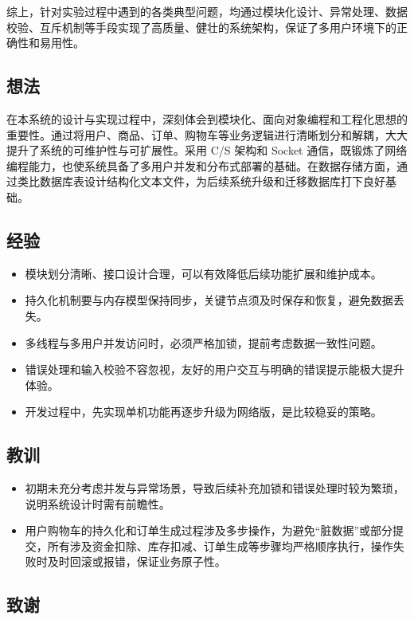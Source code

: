 \documentclass[11pt]{article}
\begin{document}
综上，针对实验过程中遇到的各类典型问题，均通过模块化设计、异常处理、数据校验、互斥机制等手段实现了高质量、健壮的系统架构，保证了多用户环境下的正确性和易用性。

\subsection{想法}

在本系统的设计与实现过程中，深刻体会到模块化、面向对象编程和工程化思想的重要性。通过将用户、商品、订单、购物车等业务逻辑进行清晰划分和解耦，大大提升了系统的可维护性与可扩展性。采用 C/S 架构和 Socket 通信，既锻炼了网络编程能力，也使系统具备了多用户并发和分布式部署的基础。在数据存储方面，通过类比数据库表设计结构化文本文件，为后续系统升级和迁移数据库打下良好基础。

\subsection{经验}

\begin{itemize}
    \item 模块划分清晰、接口设计合理，可以有效降低后续功能扩展和维护成本。
    \item 持久化机制要与内存模型保持同步，关键节点须及时保存和恢复，避免数据丢失。
    \item 多线程与多用户并发访问时，必须严格加锁，提前考虑数据一致性问题。
    \item 错误处理和输入校验不容忽视，友好的用户交互与明确的错误提示能极大提升体验。
    \item 开发过程中，先实现单机功能再逐步升级为网络版，是比较稳妥的策略。
\end{itemize}

\subsection{教训}

\begin{itemize}
    \item 初期未充分考虑并发与异常场景，导致后续补充加锁和错误处理时较为繁琐，说明系统设计时需有前瞻性。
    \item 用户购物车的持久化和订单生成过程涉及多步操作，为避免“脏数据”或部分提交，所有涉及资金扣除、库存扣减、订单生成等步骤均严格顺序执行，操作失败时及时回滚或报错，保证业务原子性。
\end{itemize}

\subsection{致谢}
\end{document}
